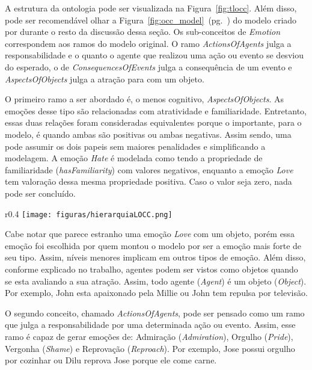 A estrutura da ontologia pode ser visualizada na Figura~\ref{fig:tlocc}. Além
disso, pode ser recomendável olhar a
Figura~\ref{fig:occ_model}~(pg.~\pageref{fig:occ_model}) do modelo criado por
\citet{ortony1988cse} durante o resto da discussão dessa seção. Os
sub-conceitos de \emph{Emotion} correspondem aos ramos do modelo \occ original.
O ramo \emph{ActionsOfAgents} julga a responsabilidade e o quanto o agente que
realizou uma ação ou evento se desviou do esperado, o de
\emph{ConsequencesOfEvents} julga a consequência de um evento e
\emph{AspectsOfObjects} julga a atração para com um objeto.

O primeiro ramo a ser abordado é, o menos cognitivo, \emph{AspectsOfObjects}.
As emoções desse tipo são relacionadas com atratividade e familiaridade.
Entretanto, essas duas relações foram consideradas equivalentes porque o
importante, para o modelo, é quando ambas são positivas ou ambas negativas.
Assim sendo, uma pode assumir os dois papeis sem maiores penalidades e
simplificando a modelagem. A emoção \emph{Hate} é modelada como tendo a
propriedade de familiaridade (\emph{hasFamiliarity}) com valores negativos,
enquanto a emoção \emph{Love} tem valoração dessa mesma propriedade positiva.
Caso o valor seja zero, nada pode ser concluído.

\begin{wrapfigure}{r}{0.4\textwidth}
  \texttt{[image: figuras/hierarquiaLOCC.png]}
  \caption{Taxonomia da ontologia proposta baseado no modelo.}
  \label{fig:tlocc}
\end{wrapfigure}

Cabe notar que parece estranho uma emoção \emph{Love} com um objeto, porém
essa emoção foi escolhida por quem montou o modelo por ser a emoção mais forte
de seu tipo. Assim, níveis menores implicam em outros tipos de emoção. Além
disso, conforme explicado no trabalho, agentes podem ser vistos como objetos
quando se esta avaliando a sua atração. Assim, todo agente (\emph{Agent}) é um
objeto (\emph{Object}). Por exemplo, John esta apaixonado pela Millie ou
John tem repulsa por televisão.

O segundo conceito, chamado \emph{ActionsOfAgents}, pode ser pensado como
um ramo que julga a responsabilidade por uma determinada ação ou evento.
Assim, esse ramo é capaz de gerar emoções de: Admiração (\emph{Admiration}),
Orgulho (\emph{Pride}), Vergonha (\emph{Shame}) e Reprovação
(\emph{Reproach}). Por exemplo, Jose possui orgulho por cozinhar ou Dilu
reprova Jose porque ele come carne.

